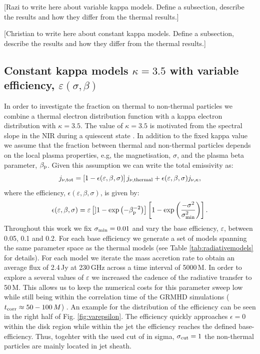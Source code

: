 [Razi to write here about variable kappa models.  Define a subsection, describe the results and how they differ from the thermal results.]

[Christian to write here about constant kappa models.  Define a subsection, describe the results and how they differ from the thermal results.]
\subsection{Constant kappa models $\kappa=3.5$ with variable efficiency, $\varepsilon(\sigma,\beta)$}

In order to investigate the fraction on thermal to non-thermal particles we combine a thermal electron distribution function with a kappa electron distribution with $\kappa=3.5$. The value of $\kappa=3.5$ is motivated from the spectral slope in the NIR during a quiescent state . In addition to the fixed kappa value we assume that the fraction between thermal and non-thermal particles depends on the local plasma properties, e.g, the magnetisation, $\sigma$, and the plasma beta parameter, $\beta_{\rm p}$. Given this assumption we can write the total emissivity as:
\begin{equation}
j_{\nu,\rm{tot}}=\left[1-\epsilon(\varepsilon,\beta, \sigma)\right] j_{\nu,\rm{thermal}} + \epsilon(\varepsilon,\beta, \sigma) j_{\nu, \kappa},
\label{eq:kappaeff}
\end{equation}
where the efficiency, $\epsilon(\varepsilon,\beta,\sigma)$, is given by:
\begin{equation}
    \epsilon(\varepsilon,\beta,\sigma)=\varepsilon\left[] 1 - \exp\left(-\beta_{\rm p}^{-2}\right)\right]\left[1-\exp\left(\frac{-\sigma^2}{\sigma_{\rm min}^2}\right)\right].
    \label{eq:efficiencybetasigma}
\end{equation}
Throughout this work we fix $\sigma_{\rm min}=0.01$ and vary the base efficiency, $\varepsilon$, between 0.05, 0.1 and 0.2. For each base efficiency we generate a set of models spanning the same parameter space as the thermal models (see Table \ref{tab:radiativemodels} for details). For each model we iterate the mass accretion rate to obtain an average flux of 2.4\,Jy at 230\,GHz across a time interval of 5000\,M. In order to explore a several values of $\varepsilon$ we increased the cadence of the radiative transfer to 50\,M. This allows us to keep the numerical costs for this parameter sweep low while still being within the correlation time of the GRMHD simulations ($t_{\rm corr}\approx 50-100\,M$) . An example for the distribution of the efficiency can be seen in the right half of  Fig. \ref{fig:varepsilon}. The efficiency quickly approaches $\epsilon=0$ within the disk region while within the jet the efficiency reaches the defined base-efficiency. Thus, togehter with the used cut of in sigma, $\sigma_{\rm cut}=1$ the non-thermal particles are mainly located in jet sheath.


